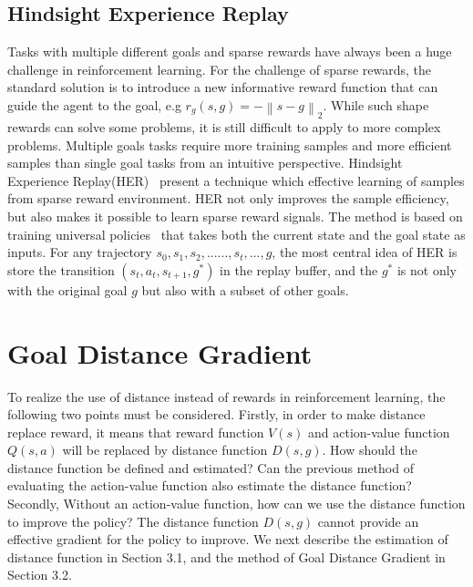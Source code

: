 \documentclass[8pt,twoside,a4paper]{article}
\begin{document}
\subsection{Hindsight Experience Replay}
Tasks with multiple different goals and sparse rewards have always been a huge challenge in reinforcement learning. For the challenge of sparse rewards, the standard solution is to introduce a new informative reward function that can guide the agent to the goal, e.g $r_g(s,g)=-\left\| s-g \right\|_2$. While such shape rewards can solve some problems, it is still difficult to apply to more complex problems. Multiple goals tasks require more training samples and more efficient samples than single goal tasks from an intuitive perspective. Hindsight Experience Replay(HER)~\cite{andrychowicz2017hindsight} present a technique which effective learning of samples from sparse reward environment. HER not only improves the sample efficiency, but also makes it possible to learn sparse reward signals. The method is based on training universal policies~\cite{schaul2015universal} that takes both the current state and the goal state as inputs. For any trajectory $s_{0},s_{1},s_{2},......,s_{t},...,g$, the most central idea of HER is store the transition $(s_{t},a_{t},s_{t+1},g^{*})$ in the replay buffer, and the $g^{*}$ is not only with the original goal $g$ but also with a subset of other goals. 

\section{Goal Distance Gradient}
To realize the use of distance instead of rewards in reinforcement learning, the following two points must be considered. Firstly, in order to make distance replace reward, it means that reward function $V(s)$ and action-value function $Q(s,a)$ will be replaced by distance function $D(s,g)$. How should the distance function be defined and estimated? Can the previous method of evaluating the action-value function also estimate the distance function? Secondly, Without an action-value function, how can we use the distance function to improve the policy? The distance function $D(s,g)$ cannot provide an effective gradient for the policy to improve. We next describe the estimation of distance function in Section 3.1, and the method of Goal Distance Gradient in Section 3.2.
\end{document}
